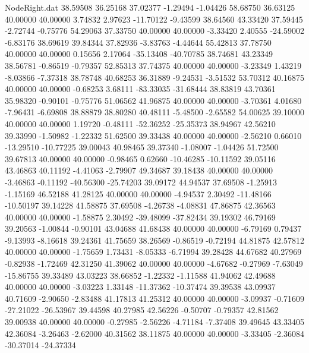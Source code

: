 \begin{filecontents}{NodeRight.dat}
  38.59508   36.25168   37.02377    -1.29494   -1.04426   58.68750   36.63125   40.00000   40.00000    3.74832    2.97623  -11.70122   -9.43599
  38.64560   43.33420   37.59445    -2.72744   -0.75776   54.29063   37.33750   40.00000   40.00000   -3.33420    2.40555  -24.59002   -6.83176
  38.69619   39.84344   37.82936    -3.83763   -4.44644   55.42813   37.78750   40.00000   40.00000    0.15656    2.17064  -35.13408  -40.70785
  38.74681   43.23349   38.56781    -0.86519   -0.79357   52.85313   37.74375   40.00000   40.00000   -3.23349    1.43219   -8.03866   -7.37318
  38.78748   40.68253   36.31889    -9.24531   -3.51532   53.70312   40.16875   40.00000   40.00000   -0.68253    3.68111  -83.33035  -31.68444
  38.83819   43.70361   35.98320    -0.90101   -0.75776   51.06562   41.96875   40.00000   40.00000   -3.70361    4.01680   -7.96431   -6.69808
  38.88879   38.80280   40.48111    -5.48500   -2.65582   54.00625   39.10000   40.00000   40.00000    1.19720   -0.48111  -52.36252  -25.35373
  38.94967   42.56210   39.33990    -1.50982   -1.22332   51.62500   39.33438   40.00000   40.00000   -2.56210    0.66010  -13.29510  -10.77225
  39.00043   40.98465   39.37340    -1.08007   -1.04426   51.72500   39.67813   40.00000   40.00000   -0.98465    0.62660  -10.46285  -10.11592
  39.05116   43.46863   40.11192    -4.41063   -2.79907   49.34687   39.18438   40.00000   40.00000   -3.46863   -0.11192  -40.56300  -25.74203
  39.09172   44.94537   37.69508    -1.25913   -1.15169   46.52188   41.28125   40.00000   40.00000   -4.94537    2.30492  -11.48166  -10.50197
  39.14228   41.58875   37.69508    -4.26738   -4.08831   47.86875   42.36563   40.00000   40.00000   -1.58875    2.30492  -39.48099  -37.82434
  39.19302   46.79169   39.20563    -1.00844   -0.90101   43.04688   41.68438   40.00000   40.00000   -6.79169    0.79437   -9.13993   -8.16618
  39.24361   41.75659   38.26569    -0.86519   -0.72194   44.81875   42.57812   40.00000   40.00000   -1.75659    1.73431   -8.05333   -6.71994
  39.28428   44.67682   40.27969    -0.82938   -1.72469   42.31250   41.39062   40.00000   40.00000   -4.67682   -0.27969   -7.63049  -15.86755
  39.33489   43.03223   38.66852    -1.22332   -1.11588   41.94062   42.49688   40.00000   40.00000   -3.03223    1.33148  -11.37362  -10.37474
  39.39538   43.09937   40.71609    -2.90650   -2.83488   41.17813   41.25312   40.00000   40.00000   -3.09937   -0.71609  -27.21022  -26.53967
  39.44598   40.27985   42.56226    -0.50707   -0.79357   42.81562   39.00938   40.00000   40.00000   -0.27985   -2.56226   -4.71184   -7.37408
  39.49645   43.33405   42.36084    -3.26463   -2.62000   40.31562   38.11875   40.00000   40.00000   -3.33405   -2.36084  -30.37014  -24.37334

\end{filecontents}
